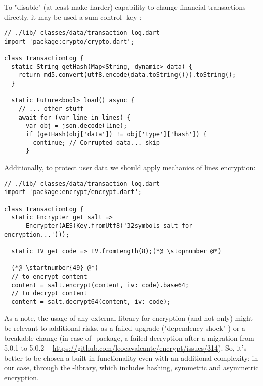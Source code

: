 To "disable" (at least make harder) capability to change financial transactions directly, it may be used a sum control 
-key :

\begin{lstlisting}
// ./lib/_classes/data/transaction_log.dart
import 'package:crypto/crypto.dart';

class TransactionLog {
  static String getHash(Map<String, dynamic> data) {
    return md5.convert(utf8.encode(data.toString())).toString();
  }

  static Future<bool> load() async {
    // ... other stuff
    await for (var line in lines) {
      var obj = json.decode(line);
      if (getHash(obj['data']) != obj['type']['hash']) {
        continue; // Corrupted data... skip
      }
\end{lstlisting}

\noindent Additionally, to protect user data we should apply mechanics of lines encryption:

\begin{lstlisting}
// ./lib/_classes/data/transaction_log.dart
import 'package:encrypt/encrypt.dart';

class TransactionLog {
  static Encrypter get salt =>
      Encrypter(AES(Key.fromUtf8('32symbols-salt-for-encryption...')));

  static IV get code => IV.fromLength(8);(*@ \stopnumber @*)

  (*@ \startnumber{49} @*)
  // to encrypt content
  content = salt.encrypt(content, iv: code).base64;
  // to decrypt content
  content = salt.decrypt64(content, iv: code);
\end{lstlisting}

\noindent As a note, the usage of any external library for encryption (and not only) might be relevant to additional 
risks, as a failed upgrade ("dependency shock" \cite{Inki23}) or a breakable change (in case of -package, a 
failed decryption after a migration from 5.0.1 to 5.0.2 -- 
\href{https://github.com/leocavalcante/encrypt/issues/314}{https://github.com/leocavalcante/encrypt/issues/314}).
So, it's better to be chosen a built-in functionality even with an additional complexity; in our case, through the 
-library, which includes hashing, symmetric and asymmetric encryption.
